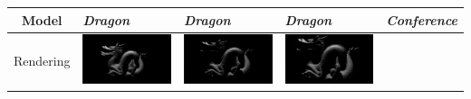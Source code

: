 \begin{table}[!ht]
\begin{center}
\begin{tabular}{| c | p{2.5cm} | p{2.5cm} | p{2.5cm} | p{2.5cm} |}
\hline
Model & \emph{Dragon} & \emph{Dragon} & \emph{Dragon} & \emph{Conference} \\
\hline
Rendering &
\includegraphics[scale=0.08,trim=0 0 0 -5]{img/results/lambertian/noocclusion-dragon} &
\includegraphics[scale=0.08,trim=0 0 0 -5]{img/results/shadowmap/480by480} &
\includegraphics[scale=0.08,trim=0 0 0 -5]{img/results/lambertian/occlusion-dragon} &

\end{tabular}
\end{center}
\end{table}
